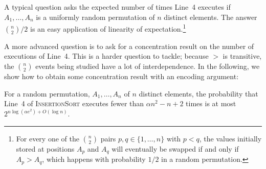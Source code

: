\documentclass[lotsofwhite]{patmorin}
\begin{document}
A typical question asks the expected number of times Line~4 executes
if $A_1,\ldots,A_n$ is a uniformly random permutation of $n$ distinct
elements.  The answer $\binom{n}{2}/2$ is an easy application of
linearity of expectation.\footnote{For every one of the $\binom{n}{2}$
pairs $p,q\in\{1,\ldots,n\}$ with $p<q$, the values initially stored at
positions $A_p$ and $A_q$ will eventually be swapped if and only if $A_p >
A_q$, which happens with probability $1/2$ in a random permutation.}

A more advanced question is to ask for a concentration result on the
number of executions of Line~4. This is a harder question to tackle;
because $>$ is transitive, the $\binom{n}{2}$ events being studied have
a lot of interdependence. In the following, we show how to obtain some
concentration result with an encoding argument:

\begin{thm}
For a random permutation, $A_1,\ldots,A_n$ of $n$ distinct elements,
the probability that Line~4 of \textsc{InsertionSort} executes fewer than
$\alpha n^2 - n + 2$ times is at most $2^{n\log(\alpha e^2)+O(\log n)}$.
\end{thm}
\end{document}
